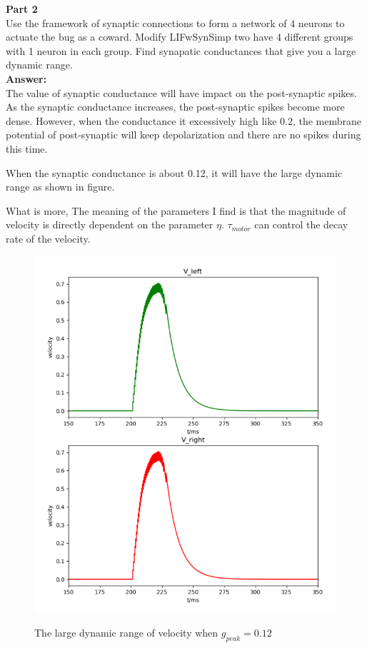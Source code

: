 \documentclass[12pt]{article}
\begin{document}
\newpage
\textbf{Part 2}
\\

Use the framework of synaptic connections to form a network of 4 neurons to
actuate the bug as a coward. Modify LIFwSynSimp two have 4 different groups with 1
neuron in each group.  Find synapatic conductances that give you a large dynamic range.  
\\

\textbf{Answer:} 
\\

The value of synaptic conductance will have impact on the post-synaptic spikes. As the synaptic conductance increases, the post-synaptic spikes become more dense. However, when the conductance it excessively high like 0.2, the membrane potential of post-synaptic will keep depolarization and there are no spikes during this time.

When the synaptic conductance is about 0.12, it will have the large dynamic range as shown in figure.

What is more, The meaning of the parameters I find is that the magnitude of velocity is directly dependent on the parameter $\eta$. $\tau_{motor}$ can control the decay rate of the velocity.
\begin{figure}[H]
\centering
    \includegraphics[width=.8\textwidth]{h3_p2_1000.png} %
  \label{img} %
  \caption{The large dynamic range of velocity when $g_{peak} = 0.12$}
\end{figure}
\end{document}
